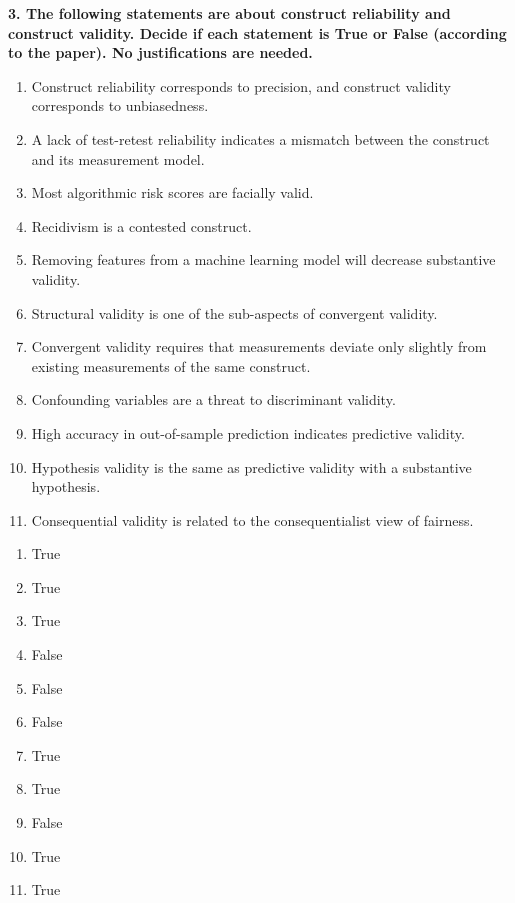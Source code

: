 \documentclass{article}
\begin{document}
\textbf{3. The following statements are about construct reliability and construct validity. Decide if each statement is True or False (according to the paper). No justifications are needed.}
\begin{enumerate}[label=\Alph*.]
    \item Construct reliability corresponds to precision, and construct validity corresponds to unbiasedness.
    \item A lack of test-retest reliability indicates a mismatch between the construct and its measurement model.
    \item Most algorithmic risk scores are facially valid.
    \item Recidivism is a contested construct. 
    \item Removing features from a machine learning model will decrease substantive validity.
    \item Structural validity is one of the sub-aspects of convergent validity.
    \item Convergent validity requires that measurements deviate only slightly from existing measurements of the same construct.
    \item Confounding variables are a threat to discriminant validity.
    \item High accuracy in out-of-sample prediction indicates predictive validity.
    \item Hypothesis validity is the same as predictive validity with a substantive hypothesis.
    \item Consequential validity is related to the consequentialist view of fairness.
\end{enumerate}

\bigskip
\begin{mdframed}
\begin{enumerate}[label=\Alph*.]
\item True
\item True 
\item True %
\item False
\item False %
\item False
\item True
\item True
\item False
\item True
\item True
\end{enumerate}
\end{mdframed}
\bigskip
\end{document}
